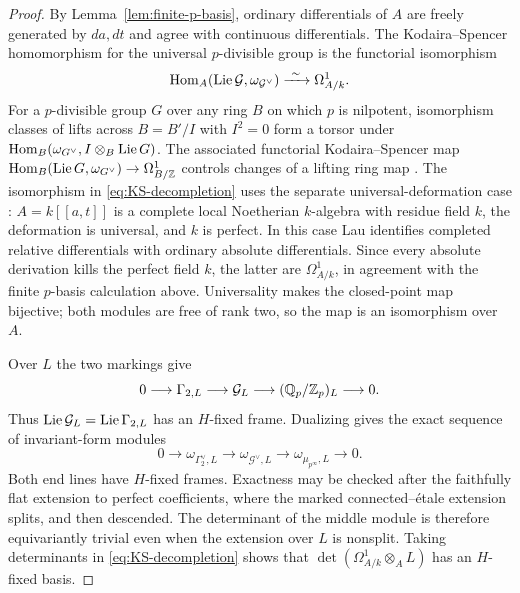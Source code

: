\begin{proof}
By Lemma~\ref{lem:finite-p-basis}, ordinary differentials of $A$ are freely
generated by $da,dt$ and agree with continuous differentials.
The Kodaira--Spencer
homomorphism for the universal $p$-divisible group is the functorial
isomorphism
\begin{equation}
 \label{eq:KS-decompletion}
 \operatorname{Hom}_A(\operatorname{Lie}\mathcal G,\omega_{\mathcal G^\vee})
 \xrightarrow{\ \sim\ }\Omega^1_{A/k}.
\end{equation}
For a $p$-divisible group $G$ over any ring $B$ on which $p$ is
nilpotent, isomorphism classes of lifts across $B=B'/I$ with $I^2=0$
form a torsor under
$\operatorname{Hom}_B(\omega_{G^\vee},I\otimes_B\operatorname{Lie} G)$.  The associated functorial
Kodaira--Spencer map
$\operatorname{Hom}_B(\operatorname{Lie} G,\omega_{G^\vee})\to\Omega^1_{B/\mathbb Z}$ controls
changes of a lifting ring map
\cite[Theorem~5.1 and Equation~(5.1), p.~226]{Lau10}.
The isomorphism in \eqref{eq:KS-decompletion} uses the separate
universal-deformation case
\cite[paragraph following Equation~(5.2), p.~227]{Lau10}:
$A=k[[a,t]]$ is a complete local Noetherian $k$-algebra with residue
field $k$, the deformation is universal, and $k$ is perfect.
In this case Lau identifies completed relative differentials with
ordinary absolute differentials.  Since every absolute derivation kills
the perfect field $k$, the latter are $\Omega^1_{A/k}$, in agreement
with the finite $p$-basis calculation above.  Universality makes the
closed-point map bijective; both modules are free of rank two, so the
map is an isomorphism over $A$.

Over $L$ the two markings give
\[
 0\longrightarrow\Gamma_{2,L}
 \longrightarrow\mathcal G_L
 \longrightarrow(\mathbb Q_p/\mathbb Z_p)_L\longrightarrow0.
\]
Thus $\operatorname{Lie}\mathcal G_L=\operatorname{Lie}\Gamma_{2,L}$ has an $H$-fixed frame.
Dualizing gives the exact sequence of invariant-form modules
\begin{equation}
 \label{eq:dual-hodge-marked-sequence}
 0\longrightarrow\omega_{\Gamma_2^\vee,L}
 \longrightarrow\omega_{\mathcal G^\vee,L}
 \longrightarrow\omega_{\mu_{p^\infty},L}
 \longrightarrow0.
\end{equation}
Both end lines have $H$-fixed frames.  Exactness may be checked after
the faithfully flat extension to perfect coefficients, where the
marked connected--\'{e}tale extension splits, and then descended.
The determinant of the middle module is therefore equivariantly
trivial even when the extension over $L$ is nonsplit.  Taking
determinants in \eqref{eq:KS-decompletion} shows that
$\det(\Omega^1_{A/k}\otimes_A L)$ has an $H$-fixed basis.


\end{proof}
